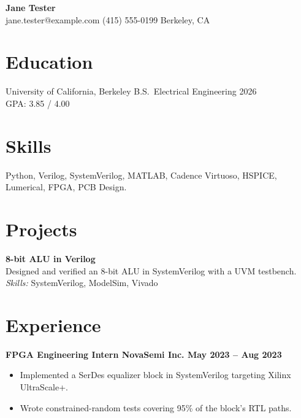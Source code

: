 \documentclass[11pt,letterpaper]{article}
\begin{document}
\begin{center}
{\LARGE \textbf{Jane Tester}}\\[2pt]
\small jane.tester@example.com \textbullet{} (415) 555-0199 \textbullet{} Berkeley, CA
\end{center}

\section*{Education}
\noindent University of California, Berkeley \textbar{} B.S.\ Electrical Engineering \textbar{} 2026\\
GPA: 3.85 / 4.00

\section*{Skills}
Python, Verilog, SystemVerilog, MATLAB, Cadence Virtuoso, HSPICE, Lumerical, FPGA, PCB Design.

\section*{Projects}
\noindent\textbf{8-bit ALU in Verilog}\\
Designed and verified an 8-bit ALU in SystemVerilog with a UVM testbench.\\
\textit{Skills:} SystemVerilog, ModelSim, Vivado

\section*{Experience}
\noindent\textbf{FPGA Engineering Intern \textbar{} NovaSemi Inc. \textbar{} May 2023 -- Aug 2023}\\
\begin{itemize}
\item Implemented a SerDes equalizer block in SystemVerilog targeting Xilinx UltraScale+.
\item Wrote constrained-random tests covering 95\% of the block's RTL paths.
\end{itemize}
\end{document}
